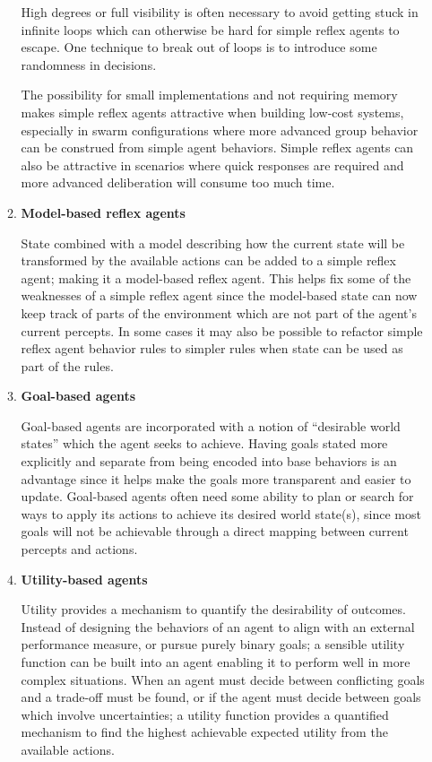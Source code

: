 \begin{enumerate}
\begin{enumerate}
High degrees or full visibility is often necessary to avoid getting stuck in infinite loops which can otherwise be hard for simple reflex agents to escape. One technique to break out of loops is to introduce some randomness in decisions.

The possibility for small implementations and not requiring memory makes simple reflex agents attractive when building low-cost systems, especially in swarm configurations where more advanced group behavior can be construed from simple agent behaviors. Simple reflex agents can also be attractive in scenarios where quick responses are required and more advanced deliberation will consume too much time.

\item \textbf{Model-based reflex agents}

State combined with a model describing how the current state will be transformed by the available actions can be added to a simple reflex agent; making it a model-based reflex agent. This helps fix some of the weaknesses of a simple reflex agent since the model-based state can now keep track of parts of the environment which are not part of the agent's current percepts. In some cases it may also be possible to refactor simple reflex agent behavior rules to simpler rules when state can be used as part of the rules.

\item \textbf{Goal-based agents}

Goal-based agents are incorporated with a notion of ``desirable world states'' which the agent seeks to achieve. Having goals stated more explicitly and separate from being encoded into base behaviors is an advantage since it helps make the goals more transparent and easier to update. Goal-based agents often need some ability to plan or search for ways to apply its actions to achieve its desired world state(s), since most goals will not be achievable through a direct mapping between current percepts and actions.

\item \textbf{Utility-based agents} 

Utility provides a mechanism to quantify the desirability of outcomes. Instead of designing the behaviors of an agent to align with an external performance measure, or pursue purely binary goals; a sensible utility function can be built into an agent enabling it to perform well in more complex situations. When an agent must decide between conflicting goals and a trade-off must be found, or if the agent must decide between goals which involve uncertainties; a utility function provides a quantified mechanism to find the highest achievable expected utility from the available actions.

\end{enumerate}

\end{enumerate}



